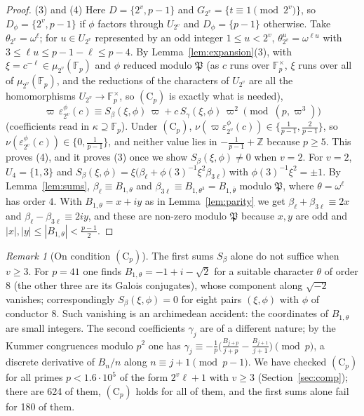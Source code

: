 \documentclass[11pt]{amsart}
\theoremstyle{definition}
\theoremstyle{remark}
\newtheorem{remark}[theorem]{Remark}
\providecommand{\Z}{\mathbb Z}
\providecommand{\F}{\mathbb F}
\newcommand{\fP}{\mathfrak P}
\numberwithin{equation}{section}
\begin{document}
\begin{proof}
(3) and (4)
Here $D=\{2^v,p-1\}$ and $G_{2^v}=\{t\equiv1\pmod{2^v}\}$, so $D_\phi=\{2^v,p-1\}$ if $\phi$ factors through $U_{2^v}$ and $D_\phi=\{p-1\}$ otherwise.
Take $\theta_{2^v}=\omega^{\ell}$; for $u\in U_{2^v}$ represented by an odd integer $1\le u<2^v$, $\theta_{2^v}^u=\omega^{\ell u}$ with $3\le\ell u\le p-1-\ell\le p-4$.
By Lemma~\ref{lem:expansion}(3), with $\xi=c^{-\ell}\in\mu_{2^v}(\F_p)$ and $\phi$ reduced modulo $\fP$ (as $c$ runs over $\F_p^\times$, $\xi$ runs over all of $\mu_{2^v}(\F_p)$, and the reductions of the characters of $U_{2^v}$ are all the homomorphisms $U_{2^v}\to\F_p^\times$, so $(\mathrm C_p)$ is exactly what is needed),
\[
\varpi\,\varepsilon_{2^v}^\phi(c)\equiv S_\beta(\xi,\phi)\,\varpi+c\,S_\gamma(\xi,\phi)\,\varpi^2\pmod{(p,\varpi^3)}
\]
(coefficients read in $\kappa\supseteq\F_p$).
Under $(\mathrm C_p)$, $\nu(\varpi\varepsilon_{2^v}^\phi(c))\in\{\frac1{p-1},\frac2{p-1}\}$, so $\nu(\varepsilon^\phi_{2^v}(c))\in\{0,\frac1{p-1}\}$, and neither value lies in $-\frac1{p-1}+\Z$ because $p\ge5$.
This proves (4), and it proves (3) once we show $S_\beta(\xi,\phi)\ne0$ when $v=2$.
For $v=2$, $U_4=\{1,3\}$ and $S_\beta(\xi,\phi)=\xi\bigl(\beta_\ell+\phi(3)^{-1}\xi^2\beta_{3\ell}\bigr)$ with $\phi(3)^{-1}\xi^2=\pm1$.
By Lemma~\ref{lem:sums}, $\beta_\ell\equiv B_{1,\theta}$ and $\beta_{3\ell}\equiv B_{1,\theta^3}=B_{1,\bar\theta}$ modulo $\fP$, where $\theta=\omega^\ell$ has order $4$.
With $B_{1,\theta}=x+iy$ as in Lemma~\ref{lem:parity} we get $\beta_\ell+\beta_{3\ell}\equiv2x$ and $\beta_\ell-\beta_{3\ell}\equiv2iy$, and these are non-zero modulo $\fP$ because $x,y$ are odd and $|x|,|y|\le|B_{1,\theta}|<\frac{p-1}2$.
\end{proof}

\begin{remark}[On condition $(\mathrm C_p)$]\label{rem:Cp}
The first sums $S_\beta$ alone do not suffice when $v\ge3$.
For $p=41$ one finds $B_{1,\theta}=-1+i-\sqrt2$ for a suitable character $\theta$ of order $8$ (the other three are its Galois conjugates), whose component along $\sqrt{-2}$ vanishes; correspondingly $S_\beta(\xi,\phi)=0$ for eight pairs $(\xi,\phi)$ with $\phi$ of conductor $8$.
Such vanishing is an archimedean accident: the coordinates of $B_{1,\theta}$ are small integers.
The second coefficients $\gamma_j$ are of a different nature; by the Kummer congruences modulo $p^2$ one has $\gamma_j\equiv-\frac1p\bigl(\frac{B_{j+p}}{j+p}-\frac{B_{j+1}}{j+1}\bigr)\pmod p$, a discrete derivative of $B_n/n$ along $n\equiv j+1\pmod{p-1}$.
We have checked $(\mathrm C_p)$ for all primes $p<1.6\cdot10^5$ of the form $2^v\ell+1$ with $v\ge3$ (Section~\ref{sec:comp}); there are 624 of them, $(\mathrm C_p)$ holds for all of them, and the first sums alone fail for 180 of them.
\end{remark}
\end{document}

